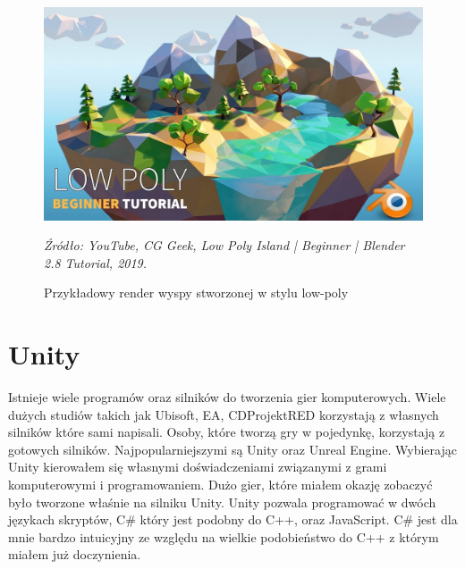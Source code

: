 \begin{figure}[hbt!]
\centering
  \includegraphics[width=0.75\linewidth]{lowpolytuto.jpg}
  \caption{Przykładowy render wyspy stworzonej w stylu low-poly}\label{rys_1}
  \begin{minipage}[t]{0.75\linewidth}
    \emph{Źródło: YouTube, CG Geek, Low Poly Island | Beginner | Blender 2.8 Tutorial, 2019.}
  \end{minipage}
\end{figure}

\section{Unity}
\indent Istnieje wiele programów oraz silników do tworzenia gier komputerowych. Wiele dużych studiów takich jak Ubisoft, EA, CDProjektRED korzystają z własnych silników które sami napisali. Osoby, które tworzą gry w pojedynkę, korzystają z gotowych silników. Najpopularniejszymi są Unity oraz Unreal Engine. Wybierając Unity kierowałem się własnymi doświadczeniami związanymi z grami komputerowymi i programowaniem. Dużo gier, które miałem okazję zobaczyć było tworzone właśnie na silniku Unity. Unity pozwala programować w dwóch językach skryptów, C\# który jest podobny do C++, oraz JavaScript. C\# jest dla mnie bardzo intuicyjny ze względu na wielkie podobieństwo do C++ z którym miałem już doczynienia.